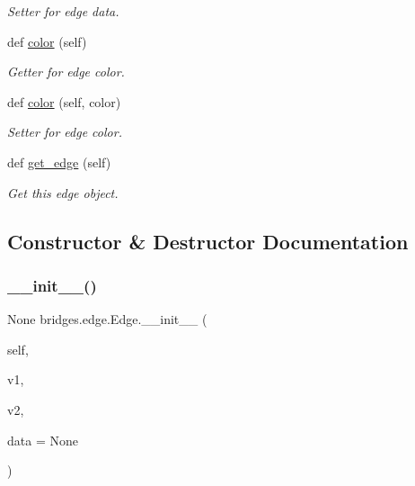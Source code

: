 \begin{DoxyCompactItemize}
\begin{DoxyCompactList}\small\item\em Setter for edge data. \end{DoxyCompactList}\item 
def \mbox{\hyperlink{classbridges_1_1edge_1_1_edge_a24a4845aeae4ca6fc432b6d0b7fa78c2}{color}} (self)
\begin{DoxyCompactList}\small\item\em Getter for edge color. \end{DoxyCompactList}\item 
def \mbox{\hyperlink{classbridges_1_1edge_1_1_edge_a81ccb5ffd5838829e1a2217846c4df77}{color}} (self, color)
\begin{DoxyCompactList}\small\item\em Setter for edge color. \end{DoxyCompactList}\item 
def \mbox{\hyperlink{classbridges_1_1edge_1_1_edge_a406b906ea8e177a6e54f6c794c04df3d}{get\+\_\+edge}} (self)
\begin{DoxyCompactList}\small\item\em Get this edge object. \end{DoxyCompactList}\end{DoxyCompactItemize}


\subsection{Constructor \& Destructor Documentation}
\mbox{\label{classbridges_1_1edge_1_1_edge_aa08bc5f3303681a923f14fdb31e85768}} 
\subsubsection{\texorpdfstring{\_\_init\_\_()}{\_\_init\_\_()}}
{\footnotesize\ttfamily  None bridges.\+edge.\+Edge.\+\_\+\+\_\+init\+\_\+\+\_\+ (\begin{DoxyParamCaption}\item[{}]{self,  }\item[{}]{v1,  }\item[{}]{v2,  }\item[{}]{data = {\ttfamily None} }\end{DoxyParamCaption})}



